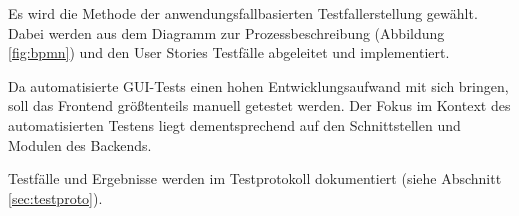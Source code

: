 \documentclass[a4paper,11pt,listof=numbered,glossary=totoc,parskip=half,toc=bib]{scrreprt}
\begin{document}
	Es wird die Methode der anwendungsfallbasierten Testfallerstellung gewählt. Dabei werden aus dem Diagramm zur Prozessbeschreibung (Abbildung \ref{fig:bpmn}) und den User Stories Testfälle abgeleitet und implementiert. 
	
	Da automatisierte GUI-Tests einen hohen Entwicklungsaufwand mit sich bringen, soll das Frontend größtenteils manuell getestet werden. Der Fokus im Kontext des automatisierten Testens liegt dementsprechend auf den Schnittstellen und Modulen des Backends. 
	
	Testfälle und Ergebnisse werden im Testprotokoll dokumentiert (siehe Abschnitt \ref{sec:testproto}).
	
	\printglossaries
	\newpage	
	\printbibliography[heading=bibnumbered,title=Literaturverzeichnis]
\end{document}
